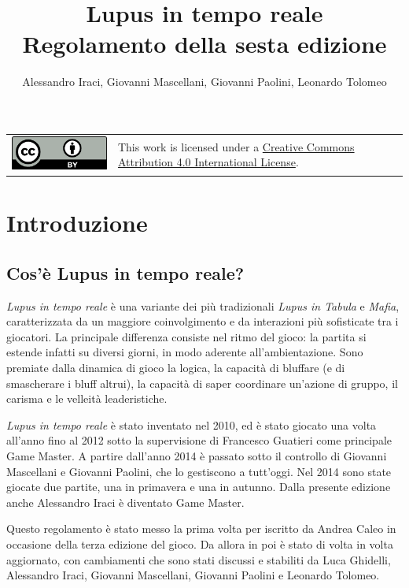 \documentclass[a4paper,10pt]{article}
\title{Lupus in tempo reale\\ Regolamento della sesta edizione}
\author{Alessandro Iraci, Giovanni Mascellani, Giovanni Paolini, Leonardo Tolomeo}
\begin{document}
\maketitle

\begin{tabular}{lp{}}
 \begin{minipage}{0.22\textwidth}
  \vspace{3mm}
  \href{http://creativecommons.org/licenses/by/4.0/}{\includegraphics{ccby.pdf}}
 \end{minipage}
 &
 This work is licensed under a \href{http://creativecommons.org/licenses/by/4.0/}{Creative Commons Attribution 4.0 International License}.
\end{tabular}


\section{Introduzione}

\subsection{Cos'è Lupus in tempo reale?}

\emph{Lupus in tempo reale} è una variante dei più tradizionali \emph{Lupus in Tabula} e \emph{Mafia}, caratterizzata da un maggiore coinvolgimento e da interazioni più sofisticate tra i giocatori.
La principale differenza consiste nel ritmo del gioco: la partita si estende infatti su diversi giorni, in modo aderente all'ambientazione.
Sono premiate dalla dinamica di gioco la logica, la capacità di bluffare (e di smascherare i bluff altrui), la capacità di saper coordinare un’azione di gruppo, il carisma e le velleità leaderistiche.

\emph{Lupus in tempo reale} è stato inventato nel 2010, ed è stato giocato una volta all'anno fino al 2012 sotto la supervisione di Francesco Guatieri come principale Game Master. A partire dall'anno 2014 è passato sotto il controllo di Giovanni Mascellani e Giovanni Paolini, che lo gestiscono a tutt'oggi. Nel 2014 sono state giocate due partite, una in primavera e una in autunno. Dalla presente edizione anche Alessandro Iraci è diventato Game Master.

Questo regolamento è stato messo la prima volta per iscritto da Andrea Caleo in occasione della terza edizione del gioco. Da allora in poi è stato di volta in volta aggiornato, con cambiamenti che sono stati discussi e stabiliti da Luca Ghidelli, Alessandro Iraci, Giovanni Mascellani, Giovanni Paolini e Leonardo Tolomeo.
\end{document}
